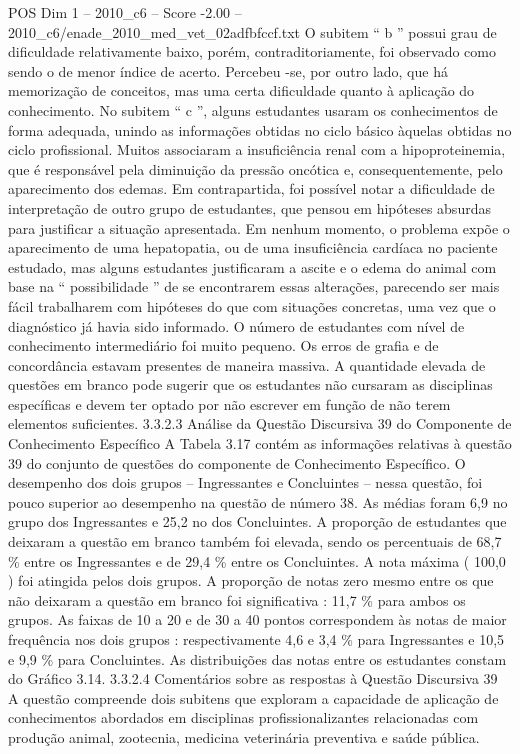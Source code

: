 \begin{textsample}{POS Dim 1 – 2010\_c6 – Score -2.00 – 2010\_c6/enade\_2010\_med\_vet\_02adfbfccf.txt}
O subitem “ b ” possui grau de dificuldade relativamente baixo, porém, contraditoriamente, foi observado como sendo o de menor índice de acerto.
Percebeu -se, por outro lado, que há memorização de conceitos, mas uma certa dificuldade quanto à aplicação do conhecimento.
No subitem “ c ”, alguns estudantes usaram os conhecimentos de forma adequada, unindo as informações obtidas no ciclo básico àquelas obtidas no ciclo profissional.
Muitos associaram a insuficiência renal com a hipoproteinemia, que é responsável pela diminuição da pressão oncótica e, consequentemente, pelo aparecimento dos edemas.
Em contrapartida, foi possível notar a dificuldade de interpretação de outro grupo de estudantes, que pensou em hipóteses absurdas para justificar a situação apresentada.
Em nenhum momento, o problema expõe o aparecimento de uma hepatopatia, ou de uma insuficiência cardíaca no paciente estudado, mas alguns estudantes justificaram a ascite e o edema do animal com base na “ possibilidade ” de se encontrarem essas alterações, parecendo ser mais fácil trabalharem com hipóteses do que com situações concretas, uma vez que o diagnóstico já havia sido informado.
O número de estudantes com nível de conhecimento intermediário foi muito pequeno.
Os erros de grafia e de concordância estavam presentes de maneira massiva.
A quantidade elevada de questões em branco pode sugerir que os estudantes não cursaram as disciplinas específicas e devem ter optado por não escrever em função de não terem elementos suficientes. 3.3.2.3 Análise da Questão Discursiva 39 do Componente de Conhecimento Específico A Tabela 3.17 contém as informações relativas à questão 39 do conjunto de questões do componente de Conhecimento Específico.
O desempenho dos dois grupos – Ingressantes e Concluintes – nessa questão, foi pouco superior ao desempenho na questão de número 38.
As médias foram 6,9 no grupo dos Ingressantes e 25,2 no dos Concluintes.
A proporção de estudantes que deixaram a questão em branco também foi elevada, sendo os percentuais de 68,7 \% entre os Ingressantes e de 29,4 \% entre os Concluintes.
A nota máxima ( 100,0 ) foi atingida pelos dois grupos.
A proporção de notas zero mesmo entre os que não deixaram a questão em branco foi significativa : 11,7 \% para ambos os grupos.
As faixas de 10 a 20 e de 30 a 40 pontos correspondem às notas de maior frequência nos dois grupos : respectivamente 4,6 e 3,4 \% para Ingressantes e 10,5 e 9,9 \% para Concluintes.
As distribuições das notas entre os estudantes constam do Gráfico 3.14. 3.3.2.4 Comentários sobre as respostas à Questão Discursiva 39 A questão compreende dois subitens que exploram a capacidade de aplicação de conhecimentos abordados em disciplinas profissionalizantes relacionadas com produção animal, zootecnia, medicina veterinária preventiva e saúde pública.

\end{textsample}
